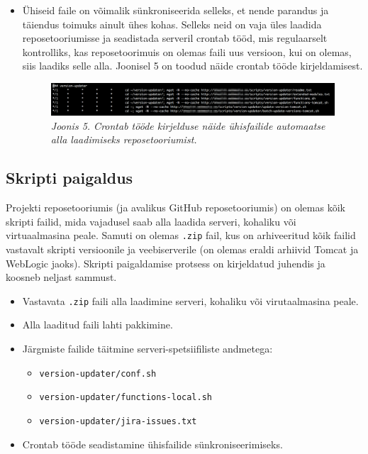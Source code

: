 \documentclass[12pt]{report}
\newcommand{\code}[1]{\texttt{#1}}
\begin{document}
\begin{itemize}
   \item Ühiseid faile on võimalik sünkroniseerida selleks, et nende parandus ja täiendus toimuks ainult ühes kohas. Selleks neid on vaja üles laadida reposetooriumisse ja seadistada serveril crontab \cite{cron} tööd, mis regulaarselt kontrolliks, kas reposetoorimuis on olemas faili uus versioon, kui on olemas, siis laadiks selle alla. Joonisel 5 on toodud näide crontab tööde kirjeldamisest.
   \begin{figure}[H]
     \begin{center} 
       \includegraphics[width=.75\textwidth]{screenshots/crontab.png}
       \caption*{\textit{Joonis 5. Crontab tööde kirjelduse näide ühisfailide automaatse alla laadimiseks reposetooriumist.}}
     \end{center}
   \end{figure}
 \end{itemize}

  \subsection{Skripti paigaldus}
  
  Projekti reposetooriumis (ja avalikus GitHub reposetooriumis) on olemas kõik skripti failid, mida vajadusel saab alla laadida serveri, kohaliku või virtuaalmasina peale. Samuti on olemas \code{.zip} fail, kus on arhiveeritud kõik failid vastavalt skripti versioonile ja veebiserverile (on olemas eraldi arhiivid Tomcat ja WebLogic jaoks). Skripti paigaldamise protsess on kirjeldatud juhendis ja koosneb neljast sammust.
  \begin{itemize}
    \item Vastavata \code{.zip} faili alla laadimine serveri, kohaliku või virutaalmasina peale.
    \item Alla laaditud faili lahti pakkimine.
    \item Järgmiste failide täitmine serveri-spetsiifiliste andmetega:
    \begin{itemize}
      \item \code{version-updater/conf.sh}
      \item \code{version-updater/functions-local.sh}
      \item \code{version-updater/jira-issues.txt}
    \end{itemize}
    \item Crontab tööde seadistamine ühisfailide sünkroniseerimiseks.
  \end{itemize}
  
\end{document}
